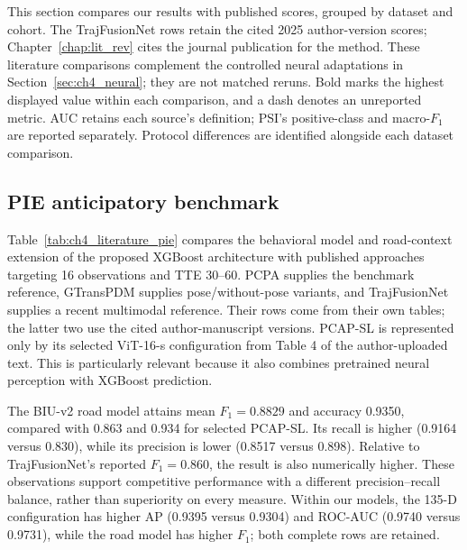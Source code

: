 This section compares our results with published scores, grouped by dataset and cohort.
The TrajFusionNet rows retain the cited 2025 author-version scores; Chapter~\ref{chap:lit_rev}
cites the journal publication for the method.
These literature comparisons complement the controlled neural adaptations in
Section~\ref{sec:ch4_neural}; they are not matched reruns. Bold marks the highest
displayed value within each comparison, and a dash denotes an unreported metric.
AUC retains each source's definition; PSI's positive-class and macro-$F_1$ are reported
separately. Protocol differences are identified alongside each dataset comparison.

\subsection{PIE anticipatory benchmark}

Table~\ref{tab:ch4_literature_pie} compares the behavioral model and road-context extension of the proposed XGBoost architecture
with published approaches targeting 16 observations and TTE 30--60. PCPA supplies the
benchmark reference, GTransPDM supplies pose/without-pose variants, and TrajFusionNet
supplies a recent multimodal reference. Their rows come from their own tables; the latter
two use the cited author-manuscript versions. PCAP-SL is represented only by its selected
ViT-16-s configuration from Table 4 of the author-uploaded text. This is particularly
relevant because it also combines pretrained neural perception with XGBoost prediction.



The BIU-v2 road model attains mean $F_1=0.8829$ and accuracy 0.9350, compared with
0.863 and 0.934 for selected PCAP-SL. Its recall is higher (0.9164 versus 0.830),
while its precision is lower (0.8517 versus 0.898). Relative to TrajFusionNet's reported
$F_1=0.860$, the result is also numerically higher. These observations support competitive
performance with a different precision--recall balance, rather than superiority on every
measure. Within our models, the 135-D configuration has higher AP (0.9395 versus 0.9304)
and ROC-AUC (0.9740 versus 0.9731), while the road model has higher $F_1$; both complete
rows are retained.

